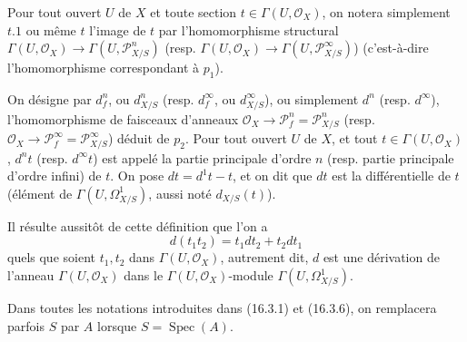 Pour tout ouvert $U$ de $X$ et toute section $t\in\Gamma(U,\mathcal{O}_X)$, on
notera simplement $t.1$ ou même $t$ l'image de $t$ par l'homomorphisme
structural $\Gamma(U,\mathcal{O}_X)\to\Gamma(U,\mathscr{P}_{X/S}^n)$ (resp.
$\Gamma(U,\mathcal{O}_X)\to\Gamma(U,\mathscr{P}_{X/S}^\infty)$)
(c'est-à-dire l'homomorphisme correspondant à $p_1$).

\begin{definition}[16.3.6]
\label{IV.16.3.6}
On désigne par $d_f^n$, ou $d_{X/S}^n$ (resp. $d_f^\infty$, ou
$d_{X/S}^\infty$), ou simplement $d^n$ (resp. $d^\infty$), l'homomorphisme de
faisceaux d'anneaux $\mathcal{O}_X\to\mathscr{P}_f^n=\mathscr{P}_{X/S}^n$
(resp. $\mathcal{O}_X\to\mathscr{P}_f^\infty=\mathscr{P}_{X/S}^\infty$)
déduit de $p_2$. Pour tout ouvert $U$ de $X$, et tout
$t\in\Gamma(U,\mathcal{O}_X)$, $d^nt$ (resp. $d^\infty t$) est appelé la partie
principale d'ordre $n$ (resp. partie principale d'ordre infini) de $t$. On pose
$dt=d^1t-t$, et on dit que $dt$ est la différentielle de $t$ (élément de
$\Gamma(U,\Omega_{X/S}^1)$, aussi noté $d_{X/S}(t)$).
\end{definition}

Il résulte aussitôt de cette définition que l'on a
\[
  d(t_1t_2)=t_1dt_2+t_2dt_1
  \tag{16.3.6.1}
  \label{IV.16.3.6.1}
\]
quels que soient $t_1,t_2$ dans $\Gamma(U,\mathcal{O}_X)$, autrement dit, $d$
est une dérivation de l'anneau $\Gamma(U,\mathcal{O}_X)$ dans le
$\Gamma(U,\mathcal{O}_X)$-module $\Gamma(U,\Omega_{X/S}^1)$.

Dans toutes les notations introduites dans (16.3.1) et (16.3.6), on remplacera
parfois $S$ par $A$ lorsque $S=\operatorname{Spec}(A)$.

